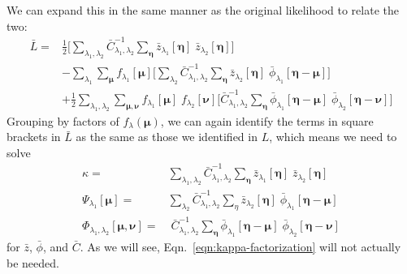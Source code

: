 \documentclass[DM,authoryear,toc]{lsstdoc}
\begin{document}
We can expand this in the same manner as the original likelihood to relate the two:
\begin{align}
\bar{L}=&
    \frac{1}{2}
    \Bigg[
        \sum_{\lambda_1,\lambda_2}
        \bar{C}^{-1}_{\lambda_1,\lambda_2}
        \sum_{\bm{\eta}}
        \bar{z}_{\lambda_1}[\bm{\eta}]
        \;\bar{z}_{\lambda_2}[\bm{\eta}]
    \Bigg]
\nonumber\\
&-
    \sum_{\lambda_1}
    \sum_{\bm{\mu}}
        f_{\lambda_1}[\bm{\mu}]
    \Bigg[
        \sum_{\lambda_2}
        \bar{C}^{-1}_{\lambda_1,\lambda_2}
        \sum_{\bm{\eta}}
        \bar{z}_{\lambda_2}[\bm{\eta}]
        \; \bar{\phi}_{\lambda_1}[\bm{\eta}-\bm{\mu}]
    \Bigg]
\nonumber\\
&+
    \frac{1}{2}\sum_{\lambda_1,\lambda_2}
        \sum_{\bm{\mu},\bm{\nu}}
        f_{\lambda_1}[\bm{\mu}]
        \; f_{\lambda_2}[\bm{\nu}]
    \Bigg[
        \bar{C}^{-1}_{\lambda_1,\lambda_2}
        \sum_{\bm{\eta}}
        \bar{\phi}_{\lambda_1}[\bm{\eta}-\bm{\mu}]
        \; \bar{\phi}_{\lambda_2}[\bm{\eta}-\bm{\nu}]
    \Bigg]
\end{align}
Grouping by factors of $f_{\lambda}(\bm{\mu})$, we can again identify the terms in square brackets in $\bar{L}$ as the same as those we identified in $L$, which means we need to solve
\begin{align}
    \kappa = &
        \sum_{\lambda_1,\lambda_2}
        \bar{C}^{-1}_{\lambda_1,\lambda_2}
        \sum_{\bm{\eta}}
        \bar{z}_{\lambda_1}[\bm{\eta}]
        \; \bar{z}_{\lambda_2}[\bm{\eta}]
    \label{eqn:kappa-factorization}
    \\
    \Psi_{\lambda_1}[\bm{\mu}] = &
        \sum_{\lambda_2}
        \bar{C}_{\lambda_1,\lambda_2}^{-1}
        \sum_{\eta}
        \bar{z}_{\lambda_2}[\bm{\eta}]
        \; \bar{\phi}_{\lambda_1}[\bm{\eta}-\bm{\mu}]
    \label{eqn:psi-factorization}
    \\
    \Phi_{\lambda_1,\lambda_2}[\bm{\mu}, \bm{\nu}] = &\;
        \bar{C}^{-1}_{\lambda_1,\lambda_2}
        \sum_{\bm{\eta}}
        \bar{\phi}_{\lambda_1}[\bm{\eta}-\bm{\mu}]
        \; \bar{\phi}_{\lambda_2}[\bm{\eta}-\bm{\nu}]
    \label{eqn:phi-factorization}
\end{align}
for $\bar{z}$, $\bar{\phi}$, and $\bar{C}$.
As we will see, Eqn.~\ref{eqn:kappa-factorization} will not actually be needed.
\end{document}
